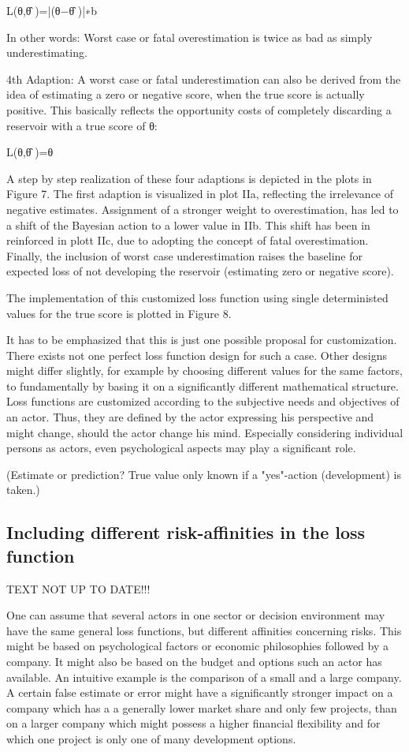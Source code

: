 	L(θ,θ̂ )=|(θ−θ̂ )|∗b
	
	In other words: Worst case or fatal overestimation is twice as bad as simply underestimating.
	
	    4th Adaption: A worst case or fatal underestimation can also be derived from the idea of estimating a zero or negative score, when the true score is actually positive. This basically reflects the opportunity costs of completely discarding a reservoir with a true score of θ:
	
	L(θ,θ̂ )=θ
	
	A step by step realization of these four adaptions is depicted in the plots in Figure 7. The first adaption is visualized in plot IIa, reflecting the irrelevance of negative estimates. Assignment of a stronger weight to overestimation, has led to a shift of the Bayesian action to a lower value in IIb. This shift has been in reinforced in plott IIc, due to adopting the concept of fatal overestimation. Finally, the inclusion of worst case underestimation raises the baseline for expected loss of not developing the reservoir (estimating zero or negative score).
	
	The implementation of this customized loss function using single deterministed values for the true score is plotted in Figure 8.
	
	It has to be emphasized that this is just one possible proposal for customization. There exists not one perfect loss function design for such a case. Other designs might differ slightly, for example by choosing different values for the same factors, to fundamentally by basing it on a significantly different mathematical structure. Loss functions are customized according to the subjective needs and objectives of an actor. Thus, they are defined by the actor expressing his perspective and might change, should the actor change his mind. Especially considering individual persons as actors, even psychological aspects may play a significant role.
	
	(Estimate or prediction? True value only known if a "yes"-action (development) is taken.)
	
	\subsection{Including different risk-affinities in the loss function}
	
	TEXT NOT UP TO DATE!!!
	
	One can assume that several actors in one sector or decision environment may have the same general loss functions, but different affinities concerning risks. This might be based on psychological factors or economic philosophies followed by a company. It might also be based on the budget and options such an actor has available. An intuitive example is the comparison of a small and a large company. A certain false estimate or error might have a significantly stronger impact on a company which has a a generally lower market share and only few projects, than on a larger company which might possess a higher financial flexibility and for which one project is only one of many development options.
	
